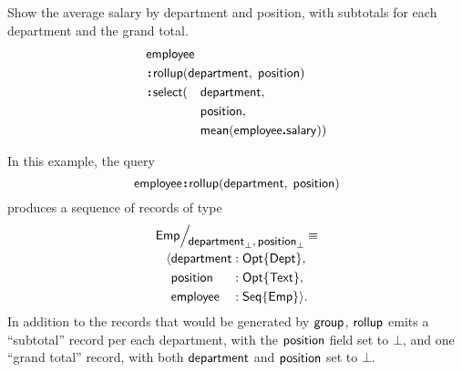 \begin{demo}
    \label{ex:rollup}
    Show the average salary by department and position, with subtotals for each
    department and the grand total.
    \begin{alignat*}{2}
        & \Employee\hidewidth && \\
        & \Apply\Rollup(\Department,\; \Position)\hidewidth && \\
        & \Apply\Select(&& \Department, \\
        & && \Position, \\
        & && \Mean(\Employee\To\Salary))
    \end{alignat*}
\end{demo}

In this example, the query
\begin{equation*}
    \mathsf{employee}\!\boldsymbol{:}\!\mathsf{rollup}(\mathsf{department},\; \mathsf{position})
\end{equation*}
produces a sequence of records of type
\begin{multline*}
    \Quotient{\Emp}{\Department_{\bot},\Position_{\bot}} \equiv \\
    \begin{alignedat}{3}
        & \Tuple{&& \Department && : \Opt{\Dept}, \\
        & && \Position && : \Opt{\Text}, \\
        & && \Employee && : \Seq{\Emp}}.
    \end{alignedat}
\end{multline*}
In addition to the records that would be generated by $\mathsf{group}$, $\mathsf{rollup}$ emits
a ``subtotal'' record per each department, with the $\mathsf{position}$ field set to
$\bot$, and one ``grand total'' record, with both $\mathsf{department}$ and $\mathsf{position}$
set to $\bot$.

